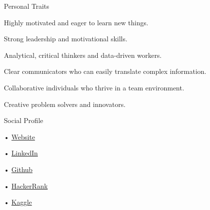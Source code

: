\documentclass{resume} %
\begin{document}
\begin{rSection}{Personal Traits}
\item Highly motivated and eager to learn new things.
\item Strong leadership and motivational skills.
\item Analytical, critical thinkers and data-driven workers.
\item Clear communicators who can easily translate complex information.
\item Collaborative individuals who thrive in a team environment.
\item Creative problem solvers and innovators.
\end{rSection}

\begin{rSection}{Social Profile}
\item[•] \href{https://imsazzad.github.io/}{Website}
\item[•] \href{https://www.linkedin.com/in/md-abdul-hasib-sazzad-19b88099/}{LinkedIn}
\item[•] \href{https://github.com/imsazzad/}{Github}
\item[•] \href{https://www.hackerrank.com/SazzadBuet08}{HackerRank}
\item[•] \href{https://www.kaggle.com/sazzadabdulhasib}{Kaggle}
\end{rSection}
\end{document}

